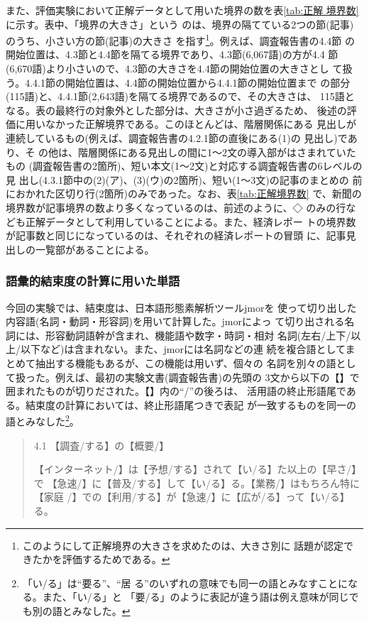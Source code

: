 また、評価実験において正解データとして用いた境界の数を表\ref{tab:正解
  境界数}に示す。表中、「境界の大きさ」\label{loc:境界の大きさ}という
のは、境界の隔てている2つの節(記事)のうち、小さい方の節(記事)の大きさ
を指す\footnote{このようにして正解境界の大きさを求めたのは、大きさ別に
  話題が認定できたかを評価するためである。}。例えば、調査報告書の4.4節
の開始位置は、4.3節と4.4節を隔てる境界であり、4.3節(6,067語)の方が4.4
節(6,670語)より小さいので、4.3節の大きさを4.4節の開始位置の大きさとし
て扱う。4.4.1節の開始位置は、4.4節の開始位置から4.4.1節の開始位置まで
の部分(115語)と、4.4.1節(2,643語)を隔てる境界であるので、その大きさは、
115語となる。表の最終行の対象外とした部分は、大きさが小さ過ぎるため、
後述の評価に用いなかった正解境界である。このほとんどは、階層関係にある
見出しが連続しているもの(例えば、調査報告書の4.2.1節の直後にある(1)の
見出し)であり、そ
の他は、階層関係にある見出しの間に1〜2文の導入部がはさまれていたもの
(調査報告書の2箇所)、短い本文(1〜2文)と対応する調査報告書の6レベルの見
出し(4.3.1節中の(2)(ア)、(3)(ウ)の2箇所)、短い(1〜3文)の記事のまとめの
前におかれた区切り行(2箇所)のみであった。なお、表\ref{tab:正解境界数}
で、新聞の境界数が記事境界の数より多くなっているのは、前述のように、◇
のみの行なども正解データとして利用していることによる。また、経済レポー
トの境界数が記事数と同じになっているのは、それぞれの経済レポートの冒頭
に、記事見出しの一覧部があることによる。



\subsubsection{語彙的結束度の計算に用いた単語}
\label{sect:単語認定}

今回の実験では、結束度は、日本語形態素解析ツールjmor\cite{NL-112-14}を
使って切り出した内容語(名詞・動詞・形容詞)を用いて計算した。jmorによっ
て切り出される名詞には、形容動詞語幹が含まれ、機能語や数字・時詞・相対
名詞(左右/上下/以上/以下など)は含まれない。また、jmorには名詞などの連
続を複合語としてまとめて抽出する機能もあるが、この機能は用いず、個々の
名詞を別々の語として扱った。例えば、最初の実験文書(調査報告書)の先頭の
3文から以下の【】で囲まれたものが切りだされた。【】内の``/''の後ろは、
活用語の終止形語尾である。結束度の計算においては、終止形語尾つきで表記
が一致するものを同一の語とみなした\footnote{「い/る」は``要る''、``居
  る''のいずれの意味でも同一の語とみなすことになる。また、「い/る」と
  「要/る」のように表記が違う語は例え意味が同じでも別の語とみなした。}。
\nobreak
\begin{quote}
4.1 【調査/する】の【概要/】

【インターネット/】は【予想/する】されて【い/る】た以上の【早さ/】で
【急速/】に【普及/する】して【い/る】る。【業務/】はもちろん特に【家庭
/】での【利用/する】が【急速/】に【広が/る】って【い/る】る。

\end{quote}


